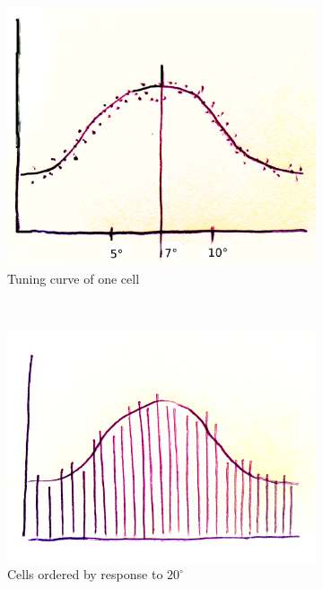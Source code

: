 \documentclass[a4paper, 12pt]{article}
\begin{document}
\begin{figure}[H]
	\centering
	\begin{subfigure}[b]{0.3\textwidth}
		\centering
		\includegraphics[width=\textwidth]{one-cell-tuning-curve.png}
		\caption{Tuning curve of one cell}
	\end{subfigure}%
	~
	\begin{subfigure}[b]{0.3\textwidth}
		\centering
		\includegraphics[width=\textwidth]{cell-order.png}
		\caption{Cells ordered by response to $20^\circ$}
	\end{subfigure}
	~ 
	\begin{subfigure}[b]{0.3\textwidth}

\end{subfigure}
\end{figure}
\end{document}

